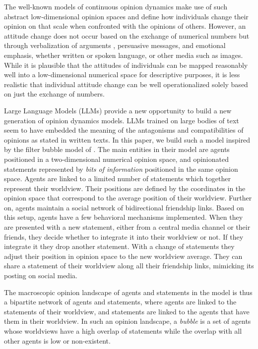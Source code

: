 \documentclass[]{ceurart}
\begin{document}
The well-known models of continuous opinion dynamics
\citep[see][]{Lorenz2025ExploringTheoryAgentbased} make use of such
abstract low-dimensional opinion spaces and define how individuals
change their opinion on that scale when confronted with the opinions of
others. However, an attitude change does not occur based on the exchange
of numerical numbers but through verbalization of arguments
\citep{BanischOlbrich2019OpinionPolarizationLearning}, persuasive
messages, and emotional emphasis, whether written or spoken language, or
other media such as images. While it is plausible that the attitudes of
individuals can be mapped reasonably well into a low-dimensional
numerical space for descriptive purposes, it is less realistic that
individual attitude change can be well operationalized solely based on
just the exchange of numbers.

Large Language Models (LLMs) provide a new opportunity to build a new
generation of opinion dynamics models. LLMs trained on large bodies of
text seem to have embedded the meaning of the antagonisms and
compatibilities of opinions as stated in written texts. In this paper,
we build such a model inspired by the filter bubble model of
\citet{GeschkeEtAl2019TriplefilterBubbleUsing}. The main entities in
their model are agents positioned in a two-dimensional numerical opinion
space, and opinionated statements represented by \emph{bits of
information} positioned in the same opinion space. Agents are linked to
a limited number of statements which together represent their worldview.
Their positions are defined by the coordinates in the opinion space that
correspond to the average position of their worldview. Further on,
agents maintain a social network of bidirectional friendship links.
Based on this setup, agents have a few behavioral mechanisms
implemented. When they are presented with a new statement, either from a
central media channel or their friends, they decide whether to integrate
it into their worldview or not. If they integrate it they drop another
statement. With a change of statements they adjust their position in
opinion space to the new worldview average. They can share a statement
of their worldview along all their friendship links, mimicking its
posting on social media.

The macroscopic opinion landscape of agents and statements in the model
is thus a bipartite network of agents and statements, where agents are
linked to the statements of their worldview, and statements are linked
to the agents that have them in their worldview. In such an opinion
landscape, a \emph{bubble} is a set of agents whose worldviews have a
high overlap of statements while the overlap with all other agents is
low or non-existent.
\end{document}
